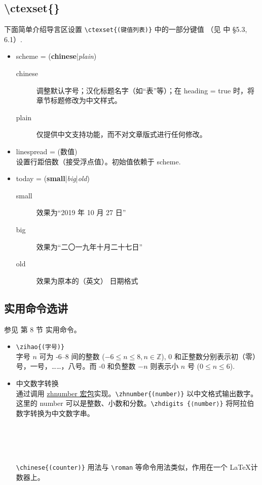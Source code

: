 \subsection{\textbackslash ctexset\{\}}
下面简单介绍导言区设置 \verb|\ctexset{(键值列表)}| 中的一部分键值 （见 \cite{ctex} 中 \S 5.3, 6.1）.
\begin{itemize}
\item scheme = (\textbf{chinese}|\emph{plain})
\begin{description}
  \item[chinese] 调整默认字号；汉化标题名字（如“表”等）；在 heading = true 时，将章节标题修改为中文样式。
  \item[plain] 仅提供中文支持功能，而不对文章版式进行任何修改。 
  \end{description}
\item linespread = (数值)\\
设置行距倍数（接受浮点值）。初始值依赖于 scheme.
\item today = (\textbf{small}|\emph{big}|\emph{old})
\begin{description}
  \item[small] 效果为“2019 年 10 月 27 日”
  \item[big] 效果为“二〇一九年十月二十七日”
  \item[old] 效果为原本的（英文） 日期格式 
\end{description}
\end{itemize}

\subsection{实用命令选讲}\label{sec:practical-options}
参见 \cite{ctex} 第 8 节 实用命令。
\begin{itemize}
\item \verb|\zihao{(字号)}| \\
字号 $n$ 可为 -6--8 间的整数 ($-6 \leq n \leq 8, n \in \mathbb{Z}$), 0 和正整数分别表示初（零）号，一号，……，八号。而 -0 和负整数 $-n$ 则表示小 $n$ 号 ($0 \leq n \leq 6$).
\item 中文数字转换 \\
通过调用 \href{http://mirrors.ctan.org/macros/latex/contrib/zhnumber/zhnumber.pdf}{zhnumber 宏包}实现。\verb|\zhnumber{(number)}| 以中文格式输出数字。这里的 number 可以是整数、小数和分数。\verb|\zhdigits {⟨number⟩}| 将阿拉伯数字转换为中文数字串。
\begin{sidelst}
 \\
 \\
 \\
\end{sidelst}
\verb|\chinese{(counter)}| 用法与 \verb|\roman| 等命令用法类似，作用在一个 \LaTeX 计数器上。
\end{itemize}

